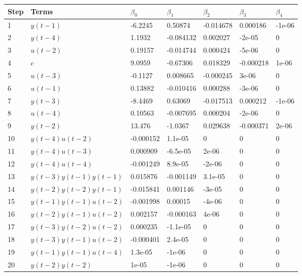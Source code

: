 \begin{tabular}{lllllll}
Step & Terms & $\beta_{0}$ & $\beta_{1}$ & $\beta_{2}$ & $\beta_{3}$ & $\beta_{4}$ \\ 
\hline 
1 & $y(t-1)$ & -6.2245 & 0.50874 & -0.014678 & 0.000186 & -1e-06 \\ 
2 & $y(t-4)$ & 1.1932 & -0.084132 & 0.002027 & -2e-05 & 0 \\ 
3 & $u(t-2)$ & 0.19157 & -0.014744 & 0.000424 & -5e-06 & 0 \\ 
4 & $c$ & 9.0959 & -0.67306 & 0.018329 & -0.000218 & 1e-06 \\ 
5 & $u(t-3)$ & -0.1127 & 0.008665 & -0.000245 & 3e-06 & 0 \\ 
6 & $u(t-1)$ & 0.13882 & -0.010416 & 0.000288 & -3e-06 & 0 \\ 
7 & $y(t-3)$ & -8.4469 & 0.63069 & -0.017513 & 0.000212 & -1e-06 \\ 
8 & $u(t-4)$ & 0.10563 & -0.007695 & 0.000204 & -2e-06 & 0 \\ 
9 & $y(t-2)$ & 13.476 & -1.0367 & 0.029638 & -0.000371 & 2e-06 \\ 
10 & $y(t-4)u(t-2)$ & -0.000152 & 1.1e-05 & 0 & 0 & 0 \\ 
11 & $y(t-4)u(t-3)$ & 0.000909 & -6.5e-05 & 2e-06 & 0 & 0 \\ 
12 & $y(t-4)u(t-4)$ & -0.001249 & 8.9e-05 & -2e-06 & 0 & 0 \\ 
13 & $y(t-3)y(t-1)y(t-1)$ & 0.015876 & -0.001149 & 3.1e-05 & 0 & 0 \\ 
14 & $y(t-2)y(t-2)y(t-1)$ & -0.015841 & 0.001146 & -3e-05 & 0 & 0 \\ 
15 & $y(t-1)y(t-1)u(t-2)$ & -0.001998 & 0.00015 & -4e-06 & 0 & 0 \\ 
16 & $y(t-2)y(t-1)u(t-2)$ & 0.002157 & -0.000163 & 4e-06 & 0 & 0 \\ 
17 & $y(t-3)y(t-2)u(t-2)$ & 0.000235 & -1.1e-05 & 0 & 0 & 0 \\ 
18 & $y(t-3)y(t-1)u(t-2)$ & -0.000401 & 2.4e-05 & 0 & 0 & 0 \\ 
19 & $y(t-1)y(t-1)u(t-4)$ & 1.3e-05 & -1e-06 & 0 & 0 & 0 \\ 
20 & $y(t-2)y(t-2)$ & 1e-05 & -1e-06 & 0 & 0 & 0 \\ 
\hline 
\end{tabular}